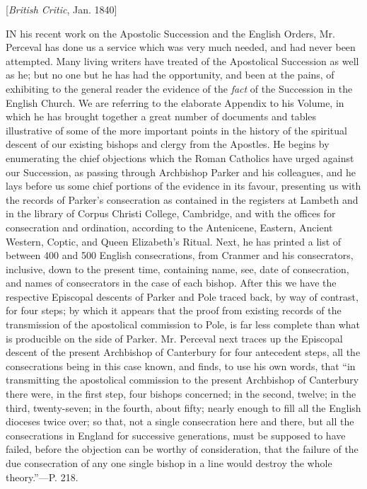 
[\emph{British Critic}, Jan. 1840]

IN his
recent work on the Apostolic Succession and the English Orders, Mr.
Perceval has done us a service which was very much needed, and had
never been attempted. Many living writers have treated of the
Apostolical Succession as well as he; but no one but he has had the
opportunity, and been at the pains, of exhibiting to the general
reader the evidence of the \emph{fact}
of the Succession in the English Church. We are referring to
the elaborate Appendix to his Volume, in which he has brought together
a great number of documents and tables illustrative of some of the
more important points in the history of the spiritual descent of our
existing bishops and clergy from the Apostles. He begins by
enumerating the chief objections which the Roman Catholics have urged
against our Succession, as passing through Archbishop Parker and his
colleagues, and he lays before us some chief portions of the evidence
in its favour, presenting us with the records of Parker's consecration
as contained in the registers at Lambeth and in the library of Corpus
Christi College, Cambridge, and with the offices for consecration and
ordination, according to the Antenicene, Eastern, Ancient Western,
Coptic, and Queen Elizabeth's Ritual. Next, he has printed a list
of between 400 and 500 English consecrations, from Cranmer and his
consecrators, inclusive, down to the present time, containing name,
see, date of consecration, and names of consecrators in the case of
each bishop. After this we have the respective Episcopal descents of
Parker and Pole traced back, by way of contrast, for four steps; by
which it appears that the proof from existing records of the
transmission of the apostolical commission to Pole, is far less
complete than what is producible on the side of Parker. Mr. Perceval
next traces up the Episcopal descent of the present Archbishop of
Canterbury for four antecedent steps, all the consecrations being in
this case known, and finds, to use his own words, that ``in
transmitting the apostolical commission to the present Archbishop of
Canterbury there were, in the first step, four bishops concerned; in
the second, twelve; in the third, twenty-seven; in the fourth, about
fifty; nearly enough to fill all the English dioceses twice over; so
that, not a single consecration here and there, but all the
consecrations in England for successive generations, must be supposed
to have failed, before the objection can be worthy of consideration,
that the failure of the due consecration of any one single bishop in a
line would destroy the whole theory.''—P. 218.

